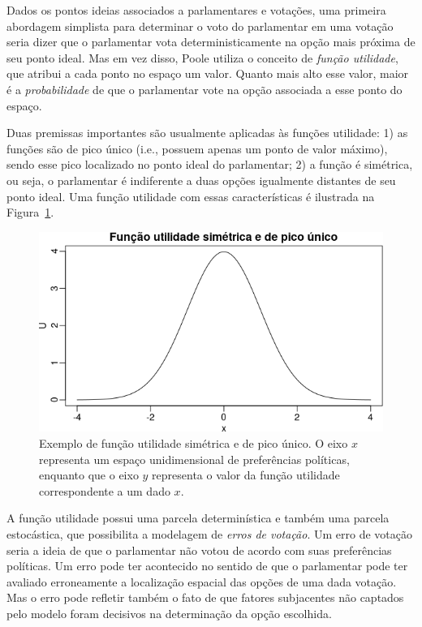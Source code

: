 \documentclass[a4paper, 12pt]{article}
\begin{document}
Dados os pontos ideias associados a parlamentares e votações, uma primeira abordagem simplista para determinar o voto do parlamentar em uma votação seria dizer que o parlamentar vota deterministicamente na opção mais próxima de seu ponto ideal. Mas em vez disso, Poole utiliza o conceito de \emph{função utilidade}, que atribui a cada ponto no espaço um valor. Quanto mais alto esse valor, maior é a \emph{probabilidade} de que o parlamentar vote na opção associada a esse ponto do espaço. 

Duas premissas importantes são usualmente aplicadas às funções utilidade: 1) as funções são de pico único (i.e., possuem apenas um ponto de valor máximo), sendo esse pico localizado no ponto ideal do parlamentar; 2) a função é simétrica, ou seja, o parlamentar é indiferente a duas opções igualmente distantes de seu ponto ideal. Uma função utilidade com essas características é ilustrada na Figura~\ref{fig:funcao_utilidade}.

\begin{figure}[h!]
  \centering
  \includegraphics[scale=0.6]{figs/funcao_utilidade.png}
  \caption{Exemplo de função utilidade simétrica e de pico único. O eixo $x$ representa um espaço unidimensional de preferências políticas, enquanto que o eixo $y$ representa o valor da função utilidade correspondente a um dado $x$.}
  \label{fig:funcao_utilidade}
\end{figure}

A função utilidade possui uma parcela determinística e também uma parcela estocástica, que possibilita a modelagem de \emph{erros de votação}. Um erro de votação seria a ideia de que o parlamentar não votou de acordo com suas preferências políticas. Um erro pode ter acontecido no sentido de que o parlamentar pode ter avaliado erroneamente a localização espacial das opções de uma dada votação. Mas o erro pode refletir também o fato de que fatores subjacentes não captados pelo modelo foram decisivos na determinação da opção escolhida.
\end{document}
